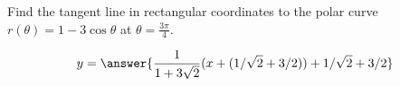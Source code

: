 \documentclass{ximera}
\author{Gregory Hartman \and Matthew Carr}
\begin{document}
\begin{exercise}





Find the tangent line in rectangular coordinates to the polar curve $r(\theta)=1-3\cos\theta$ at $\theta=\frac{3\pi}{4}$. 
\begin{prompt}
\[
y=\answer{\frac{1}{1+3\sqrt{2}}(x+(1/\sqrt{2}+3/2))+1/\sqrt{2}+3/2}
\]
\end{prompt}
 
\end{exercise}
\end{document}
